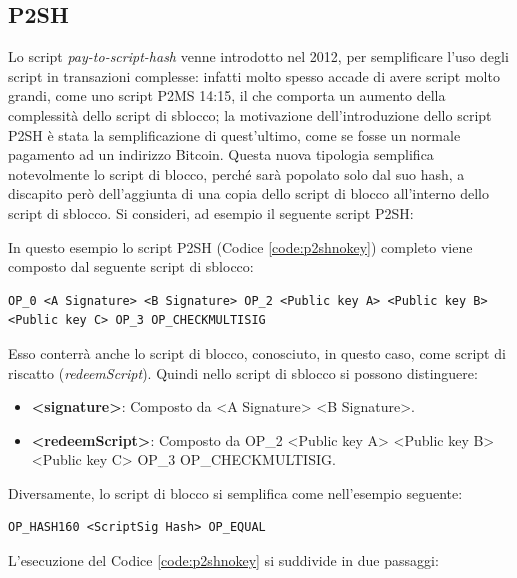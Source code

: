 \subsection{P2SH} \label{sec:p2shBitcoin}
Lo script {\it pay-to-script-hash \/} venne introdotto nel 2012, per semplificare l’uso degli script in transazioni complesse: infatti molto spesso accade di avere script molto grandi, come uno script P2MS 14:15, il che comporta un aumento della complessità dello script di sblocco; la motivazione dell’introduzione dello script P2SH è stata la semplificazione di quest’ultimo, come se fosse un normale pagamento ad un indirizzo Bitcoin.
Questa nuova tipologia semplifica notevolmente lo script di blocco, perché sarà popolato solo dal suo hash, a discapito però dell’aggiunta di una copia dello script di blocco all’interno dello script di sblocco. Si consideri, ad esempio il seguente script P2SH:



In questo esempio lo script P2SH (Codice \ref{code:p2shnokey}) completo viene composto dal seguente script di sblocco:
\begin{lstlisting}[language=bitcoinscript, label={code:p2shunlock}, caption={Script P2SH di sblocco.}]
OP_0 <A Signature> <B Signature> OP_2 <Public key A> <Public key B>
<Public key C> OP_3 OP_CHECKMULTISIG
\end{lstlisting}

Esso conterrà anche lo script di blocco, conosciuto, in questo caso, come script di riscatto ({\it redeemScript\/}). Quindi nello script di sblocco si possono distinguere:
\begin{itemize}
  \item {\bf <signature>\/}: Composto da <A Signature> <B Signature>.
  \item {\bf <redeemScript>\/}: Composto da OP\_2 <Public key A> <Public key B> <Public key C> OP\_3 OP\_CHECKMULTISIG.
\end{itemize}

Diversamente, lo script di blocco si semplifica come nell’esempio seguente:
\begin{lstlisting}[language=bitcoinscript, label={code:p2shlock}, caption={Script P2SH di blocco.}]
OP_HASH160 <ScriptSig Hash> OP_EQUAL
\end{lstlisting}

L’esecuzione del Codice \ref{code:p2shnokey} si suddivide in due passaggi:

